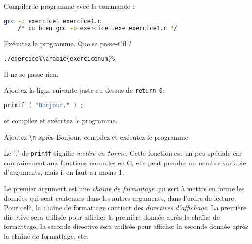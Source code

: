 \question Compiler le programme avec la commande :
\begin{solution}
  \begin{lstlisting}[language=bash]
    gcc -o exercice1 exercice1.c
    /* ou bien gcc -o exercice1.exe exercice1.c */
  \end{lstlisting}
\end{solution}

\question Exécutez le programme. Que se passe-t'il ?
\begin{solution}
  \begin{lstlisting}[language=bash]
    ./exercice%\arabic{exercicenum}%
  \end{lstlisting}
  Il ne se passe rien.
\end{solution}

\question Ajoutez la ligne suivante juste au dessus de \texttt{return 0}:
\begin{lstlisting}[language=C]
  printf ( "Bonjour." ) ;
\end{lstlisting}
et compilez et exécutez le programme.

\begin{center}
\end{center}

\question Ajoutez \verb+\n+ après Bonjour, compilez et exécutez le programme.

\begin{center}
\end{center}


Le 'f' de \texttt{printf} signifie \emph{mettre en
  \texttt{f}orme}. Cette fonction est un peu spéciale car
contrairement aux fonctions normales en C, elle peut prendre un nombre
variable d'arguments, mais il en faut au moins 1. 

Le premier argument est une \emph{chaîne de formattage} qui sert à
mettre en forme les données qui sont contenues dans les autres
arguments, dans l'ordre de lecture. Pour celà, la chaîne de formattage
contient des \emph{directives d'affichage}. La première directive sera
utilisée pour afficher la première donnée après la chaîne de
formattage, la seconde directive sera utilisée pour afficher la
seconde donnée après la chaîne de formattage, etc.

